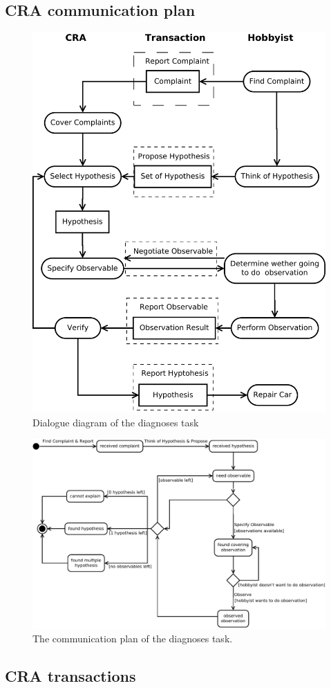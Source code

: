 \documentclass[a4paper,10pt]{article}
\begin{document}
\subsection{CRA communication plan}
\begin{figure}[htbp]
	\centering
		\includegraphics[width=1.00\textwidth]{dialogueDiagram.pdf}
	\caption{Dialogue diagram of the diagnoses task}
	\label{fig:dialogueDiagram}
\end{figure}

\begin{figure}[htbp]
	\centering
		\includegraphics[width=1.00\textwidth]{communicationPlan.pdf}
	\caption{The communication plan of the diagnoses task.}
	\label{fig:communicationPlan}
\end{figure}



\subsection{CRA transactions}


\end{document}
